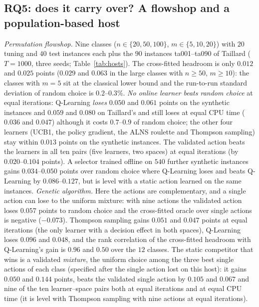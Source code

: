 \documentclass[conference,a4paper]{IEEEtran}
\begin{document}


\subsection{RQ5: does it carry over? A flowshop and a population-based host}
\label{sec:flowshop}
\emph{Permutation flowshop.} Nine classes ($n\in\{20,50,100\}$, $m\in\{5,10,20\}$) with $20$ tuning and $40$ test instances each plus the $90$ instances ta001--ta090 of Taillard ($T=1000$, three seeds; Table~\ref{tab:hosts}). The cross-fitted headroom is only $0.012$ and $0.025$ points ($0.029$ and $0.063$ in the large classes with $n\geq50$, $m\geq10$): the classes with $m=5$ sit at the classical lower bound and the run-to-run standard deviation of random choice is $0.2$--$0.3\%$.
\emph{No online learner beats random choice} at equal iterations: Q-Learning \emph{loses} $0.050$ and $0.061$ points on the synthetic instances and $0.059$ and $0.080$ on Taillard's and still loses at equal CPU time ($0.036$ and $0.047$) although it costs $0.7$--$0.9$ of random choice; the other four learners (UCB1, the policy gradient, the ALNS roulette and Thompson sampling) stay within $0.013$ points on the synthetic instances.
The validated action beats the learners in all ten pairs (five learners, two spaces) at equal iterations (by $0.020$--$0.104$ points). A selector trained offline on $540$ further synthetic instances gains $0.034$--$0.050$ points over random choice where Q-Learning loses and beats Q-Learning by $0.086$--$0.127$, but is level with a static action learned on the same instances.
\emph{Genetic algorithm.} Here the actions are complementary, and a single action can lose to the uniform mixture: with nine actions the validated action loses $0.057$ points to random choice and the cross-fitted oracle over single actions is negative ($-0.073$). Thompson sampling gains $0.051$ and $0.047$ points at equal iterations (the only learner with a decision effect in both spaces), Q-Learning loses $0.096$ and $0.048$, and the rank correlation of the cross-fitted headroom with Q-Learning's gain is $0.96$ and $0.50$ over the $12$ classes.
The static competitor that wins is a validated \emph{mixture}, the uniform choice among the three best single actions of each class (specified after the single action lost on this host): it gains $0.050$ and $0.144$ points, beats the validated single action by $0.105$ and $0.067$ and nine of the ten learner--space pairs both at equal iterations and at equal CPU time (it is level with Thompson sampling with nine actions at equal iterations).
\end{document}
